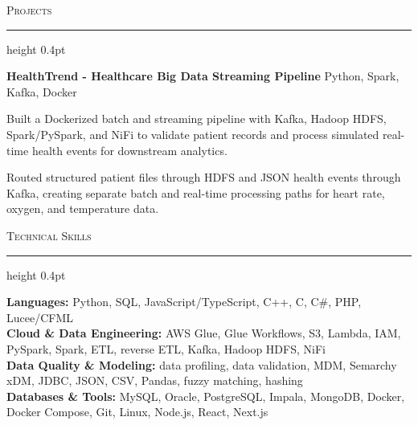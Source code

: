 \documentclass[letterpaper,11pt]{article}
\newcommand{\resumesection}[1]{%
  \par\vspace{2pt}%
  {\large\scshape #1}\par\vspace{2pt}%
  \hrule height 0.4pt\vspace{2pt}%
}
\newcommand{\projectHeading}[2]{
  \textbf{#1} \hfill #2
}
\begin{document}
\resumesection{Projects}
\projectHeading{HealthTrend - Healthcare Big Data Streaming Pipeline}{Python, Spark, Kafka, Docker}
\begin{tightitemize}
  \item Built a Dockerized batch and streaming pipeline with Kafka, Hadoop HDFS, Spark/PySpark, and NiFi to validate patient records and process simulated real-time health events for downstream analytics.
  \item Routed structured patient files through HDFS and JSON health events through Kafka, creating separate batch and real-time processing paths for heart rate, oxygen, and temperature data.
\end{tightitemize}

\resumesection{Technical Skills}
\textbf{Languages:} Python, SQL, JavaScript/TypeScript, C++, C, C\#, PHP, Lucee/CFML\\
\textbf{Cloud \& Data Engineering:} AWS Glue, Glue Workflows, S3, Lambda, IAM, PySpark, Spark, ETL, reverse ETL, Kafka, Hadoop HDFS, NiFi\\
\textbf{Data Quality \& Modeling:} data profiling, data validation, MDM, Semarchy xDM, JDBC, JSON, CSV, Pandas, fuzzy matching, hashing\\
\textbf{Databases \& Tools:} MySQL, Oracle, PostgreSQL, Impala, MongoDB, Docker, Docker Compose, Git, Linux, Node.js, React, Next.js
\end{document}
